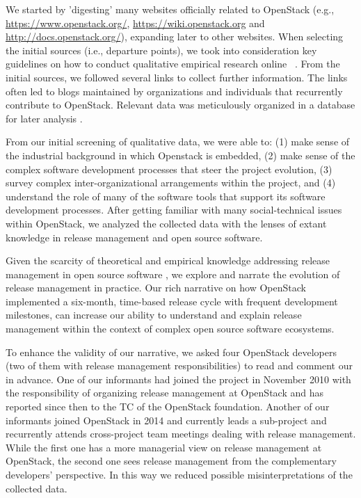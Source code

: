 \documentclass[dvipsnames]{interact}
\theoremstyle{plain}\newtheorem{theorem}{Theorem}[section]
\theoremstyle{definition}
\theoremstyle{remark}
\begin{document}
We started by 'digesting' many websites officially related to OpenStack (e.g., \url{https://www.openstack.org/}, \url{https://wiki.openstack.org} and \url{http://docs.openstack.org/}), expanding later to other websites. When selecting the initial sources (i.e., departure points), we took into consideration key guidelines on how to conduct qualitative empirical research online ~\citep{Kozinets2002,Kozinets2009}. From the initial sources, we followed several links to collect further information. The links often led to blogs maintained by organizations and individuals that recurrently contribute to OpenStack. Relevant data was meticulously organized in a database for later analysis \citep[pp 94-98]{Yin1994}. 

From our initial screening of qualitative data, we were able to: (1) make sense of the industrial background in which Openstack is embedded, (2) make sense of the complex software development processes that steer the project evolution, (3) survey complex inter-organizational arrangements within the project,  and (4) understand the role of many of the software tools that support its software development processes. After getting familiar with many social-technical issues within OpenStack, we analyzed the collected data with the lenses of extant knowledge in release management and open source software. 

Given the scarcity of theoretical and empirical knowledge addressing release management in open source software \citep{MichlmayrFitzgerald_et_al2015,PooCaamanoKnauss_et_al2017}, we explore and narrate  the evolution of release management in practice. Our rich narrative on how OpenStack implemented a six-month, time-based release cycle with frequent development milestones, can increase our ability to understand and explain release management within the context of complex open source software ecosystems. 

To enhance the validity of our narrative, we asked four OpenStack developers (two of them with release management responsibilities) to  read and comment our  in advance. One of our informants had joined the project in November 2010 with the responsibility of organizing release management at OpenStack and has reported since then to the \ac{TC} of the OpenStack foundation. Another of our informants joined OpenStack in 2014 and currently leads a sub-project and recurrently attends cross-project team meetings dealing with release management. While the first one has a more managerial view on release management at OpenStack, the second one sees release management from the complementary developers' perspective.   
In this way we reduced possible misinterpretations of the collected data. 
\end{document}
